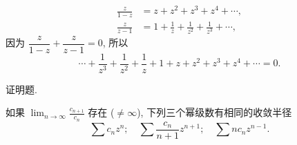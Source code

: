 \begin{homework}
\begin{subex}
\begin{align*}
				\frac{z}{1-z}&=z+z^2+z^3+z^4+\cdots,\\
				\frac{z}{z-1}&=1+\frac1z+\frac1{z^2}+\frac1{z^3}+\cdots,
			\end{align*}
			因为 $\dfrac{z}{1-z}+\dfrac{z}{z-1}=0$, 所以
			\[
				\cdots+\frac1{z^3}+\frac1{z^2}+\frac1z+1+z+z^2+z^3+z^4+\cdots=0.
			\]
	\end{subex}
	\item 证明题.
	\begin{subex}
		\item 如果 $\displaystyle\lim_{n\to\infty}\frac{c_{n+1}}{c_n}$ 存在 ($\neq\infty$), 下列三个幂级数有相同的收敛半径
		\[
			\sum c_nz^n;\quad \sum \frac{c_n}{n+1}z^{n+1};\quad \sum nc_nz^{n-1}.
		\]
	\end{subex}
\end{homework}








	


